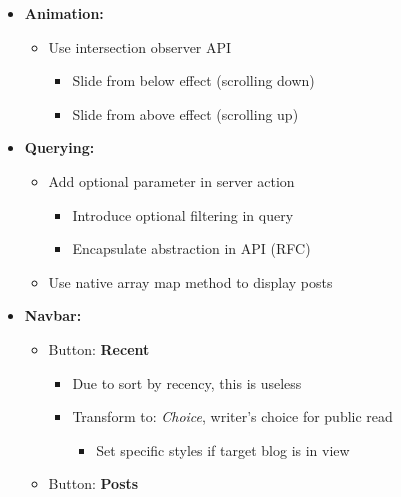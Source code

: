 \documentclass[7px]{article}
\begin{document}
{
  \begin{itemize}[label=\textsection]
    \item {\textbf{Animation: }}
      \small
      \begin{itemize}[label=$\multimapdotinv$, leftmargin=3mm]
        \item Use intersection observer API
          \footnotesize{
            \begin{itemize}[label=$\multimapinv$]
              \item Slide from below effect (scrolling down)
              \item Slide from above effect (scrolling up)
            \end{itemize}
          }
      \end{itemize}
    \item {\textbf{Querying: }}
      \small
      \begin{itemize}[label=$\multimapdotinv$, leftmargin=3mm]
        \item Add optional parameter in server action
          \footnotesize{
            \begin{itemize}[label=$\multimapinv$]
              \item Introduce optional filtering in query
              \item Encapsulate abstraction in API (RFC)
            \end{itemize}
          }
        \item Use native array map method to display posts
      \end{itemize}
    \item {\textbf{Navbar: }}
      \small
      \begin{itemize}[label=$\multimapdotinv$, leftmargin=3mm]
        \item Button: \textbf{Recent}
          \footnotesize{
            \begin{itemize}[label=$\multimapinv$]
              \item Due to sort by recency, this is useless
              \item Transform to: \textsl{Choice}, writer's choice for public read
                \begin{itemize}
                  \item Set specific styles if target blog is in view
                \end{itemize}
            \end{itemize}
          }
          \small
        \item Button: \textbf{Posts}

\end{itemize}
\end{itemize}}
\end{document}

